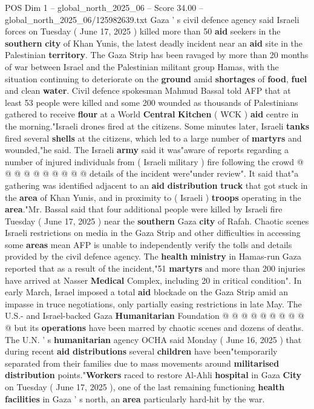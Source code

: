 \begin{textsample}{POS Dim 1 – global\_north\_2025\_06 – Score 34.00 – global\_north\_2025\_06/125982639.txt}  \label{ex:f1_pos_304}
Gaza ' s civil defence agency said Israeli forces on Tuesday ( June 17, 2025 ) killed more than 50 \textbf{aid} seekers in the \textbf{southern} \textbf{city} of Khan Yunis, the latest deadly incident near an \textbf{aid} site in the Palestinian \textbf{territory}.
The Gaza Strip has been ravaged by more than 20 months of war between Israel and the Palestinian militant group Hamas, with the situation continuing to deteriorate on the \textbf{ground} amid \textbf{shortages} of \textbf{food}, \textbf{fuel} and clean \textbf{water}.
Civil defence spokesman Mahmud Bassal told AFP that at least 53 people were killed and some 200 wounded as thousands of Palestinians gathered to receive \textbf{flour} at a World \textbf{Central} \textbf{Kitchen} ( WCK ) \textbf{aid} centre in the morning."Israeli drones fired at the citizens.
Some minutes later, Israeli \textbf{tanks} fired several \textbf{shells} at the citizens, which led to a large number of \textbf{martyrs} and wounded,"he said.
The Israeli \textbf{army} said it was"aware of reports regarding a number of injured individuals from ( Israeli military ) fire following the crowd @ @ @ @ @ @ @ @ @ @ details of the incident were"under review".
It said that"a gathering was identified adjacent to an \textbf{aid} \textbf{distribution} \textbf{truck} that got stuck in the \textbf{area} of Khan Yunis, and in proximity to ( Israeli ) \textbf{troops} operating in the \textbf{area}."Mr.
Bassal said that four additional people were killed by Israeli fire Tuesday ( June 17, 2025 ) near the \textbf{southern} Gaza \textbf{city} of Rafah.
Chaotic scenes Israeli restrictions on media in the Gaza Strip and other difficulties in accessing some \textbf{areas} mean AFP is unable to independently verify the tolls and details provided by the civil defence agency.
The \textbf{health} \textbf{ministry} in Hamas-run Gaza reported that as a result of the incident,"51 \textbf{martyrs} and more than 200 injuries have arrived at Nasser \textbf{Medical} Complex, including 20 in critical condition".
In early March, Israel imposed a total \textbf{aid} blockade on the Gaza Strip amid an impasse in truce negotiations, only partially easing restrictions in late May.
The U.S.- and Israel-backed Gaza \textbf{Humanitarian} Foundation @ @ @ @ @ @ @ @ @ @ but its \textbf{operations} have been marred by chaotic scenes and dozens of deaths.
The U.N. ' s \textbf{humanitarian} agency OCHA said Monday ( June 16, 2025 ) that during recent \textbf{aid} \textbf{distributions} several \textbf{children} have been"temporarily separated from their families due to mass movements around \textbf{militarised} \textbf{distribution} points."\textbf{Workers} raced to restore Al-Ahli \textbf{hospital} in Gaza \textbf{City} on Tuesday ( June 17, 2025 ), one of the last remaining functioning \textbf{health} \textbf{facilities} in Gaza ' s north, an \textbf{area} particularly hard-hit by the war.

\end{textsample}
